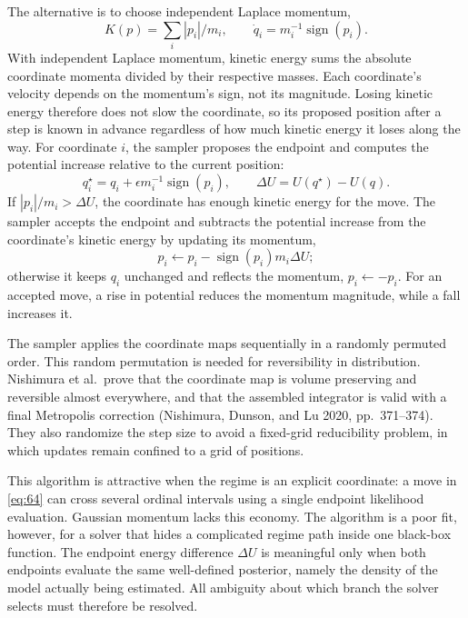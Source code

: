 \documentclass[11pt]{article}
\begin{document}
The alternative is to choose independent Laplace momentum,
\begin{equation}\label{eq:63}
 K(p)=\sum_i |p_i|/m_i,
\qquad
 \dot q_i=m_i^{-1}\operatorname{sign}(p_i).
\end{equation}
With independent Laplace momentum, kinetic energy sums the absolute coordinate momenta divided by their respective masses. Each coordinate's velocity depends on the momentum's sign, not its magnitude. Losing kinetic energy therefore does not slow the coordinate, so its proposed position after a step is known in advance regardless of how much kinetic energy it loses along the way. For coordinate $i$, the sampler proposes the endpoint and computes the potential increase relative to the current position:
\begin{equation}\label{eq:64}
 q_i^\star=q_i+\epsilon m_i^{-1}\operatorname{sign}(p_i),
\qquad
 \Delta U=U(q^\star)-U(q).
\end{equation}
If $|p_i|/m_i>\Delta U$, the coordinate has enough kinetic energy for the move. The sampler accepts the endpoint and subtracts the potential increase from the coordinate's kinetic energy by updating its momentum,
\begin{equation}\label{eq:65}
 p_i\leftarrow p_i-\operatorname{sign}(p_i)m_i\Delta U;
\end{equation}
otherwise it keeps $q_i$ unchanged and reflects the momentum, $p_i\leftarrow-p_i$. For an accepted move, a rise in potential reduces the momentum magnitude, while a fall increases it.

The sampler applies the coordinate maps sequentially in a randomly permuted order. This random permutation is needed for reversibility in distribution. Nishimura et al.\ prove that the coordinate map is volume preserving and reversible almost everywhere, and that the assembled integrator is valid with a final Metropolis correction (Nishimura, Dunson, and Lu 2020, pp.~371--374). They also randomize the step size to avoid a fixed-grid reducibility problem, in which updates remain confined to a grid of positions.

This algorithm is attractive when the regime is an explicit coordinate: a move in \eqref{eq:64} can cross several ordinal intervals using a single endpoint likelihood evaluation. Gaussian momentum lacks this economy. The algorithm is a poor fit, however, for a solver that hides a complicated regime path inside one black-box function. The endpoint energy difference $\Delta U$ is meaningful only when both endpoints evaluate the same well-defined posterior, namely the density of the model actually being estimated. All ambiguity about which branch the solver selects must therefore be resolved.
\end{document}
